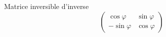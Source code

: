 Matrice inversible d'inverse
\begin{displaymath}
  \begin{pmatrix}
  \cos \varphi & \sin \varphi \\
  -\sin \varphi & \cos \varphi
\end{pmatrix}
\end{displaymath}
